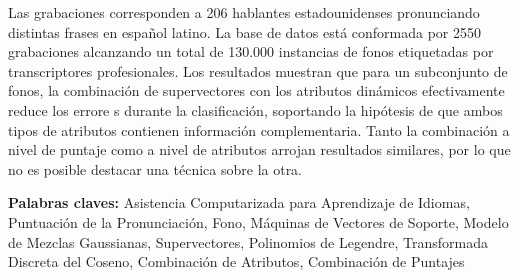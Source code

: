 
Las grabaciones corresponden a 206 hablantes estadounidenses pronunciando distintas
frases en español latino. La base de datos está conformada por 2550 grabaciones alcanzando
un total de 130.000 instancias de fonos etiquetadas
por transcriptores profesionales.
Los resultados muestran que para un subconjunto de fonos, la combinación de supervectores
con los atributos dinámicos efectivamente reduce los errore s durante la clasificación,
soportando la
hipótesis de que ambos tipos de atributos contienen información complementaria.
Tanto la combinación a nivel de puntaje como a nivel de atributos
arrojan resultados similares, por
lo que no es posible destacar una técnica sobre la otra.

\bigskip

\noindent\textbf{Palabras claves:} Asistencia Computarizada para Aprendizaje de Idiomas, Puntuación de la Pronunciación, Fono, Máquinas de Vectores de Soporte, Modelo de Mezclas Gaussianas, Supervectores, Polinomios de Legendre, Transformada Discreta del Coseno, Combinación de Atributos, Combinación de Puntajes

